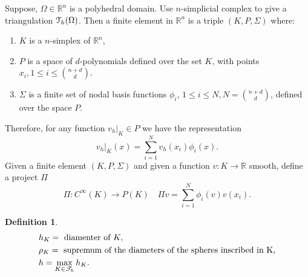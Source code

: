 \documentclass[11pt,letterpaper]{article}
\newtheorem{defn}[thm]{Definition}
\begin{document}
\begin{flushright}
\end{flushright}
Suppose, $\Omega\in \mathbb{R}^n$ is a polyhedral domain.
Use $n$-simplicial complex to give a triangulation ${\cal T}_h(\Omega)$.
Then a finite element in $\mathbb{R}^n$ is a triple $(K,P,\Sigma)$ where:
\begin{enumerate}
\item $K$ is a $n$-simplex of $\mathbb{R}^n$,
\item $P$ is a space of $d$-polynomials defined over the set $K$,
  with points $x_i,1\leq i\leq {n+d \choose d}$.
\item $\Sigma$ is a finite set of  nodal basis functions $\phi_i$,
  $1\leq i\leq N, N ={n+d \choose d}$, defined over the space $P$.
\end{enumerate}
Therefore, for any function $v_h|_K\in P$ we have the representation
\begin{equation}
  v_h|_K(x) = \sum _{i=1}^Nv_h(x_i)\phi_i(x).
\end{equation}
Given a finite element $(K,P,\Sigma)$ and given a function $v:K\rightarrow \mathbb{R}$
smooth,
define a project $\Pi$ 
\begin{displaymath}
 \Pi: C^\infty(K)\rightarrow P(K)\quad  \Pi v= \sum_{i=1}^N\phi_i(v)v(x_i).
\end{displaymath}

\begin{defn}
  \begin{displaymath}
    \begin{aligned}
      &h_K= \textmd{ diamenter of }K,\\
      &\rho_K=\textmd{ supremum of the diameters of the spheres inscribed in K,}\\
      &h= \max_{K\in \mathscr{T}_h} h_K.
    \end{aligned}
  \end{displaymath}
\end{defn}
\end{document}
